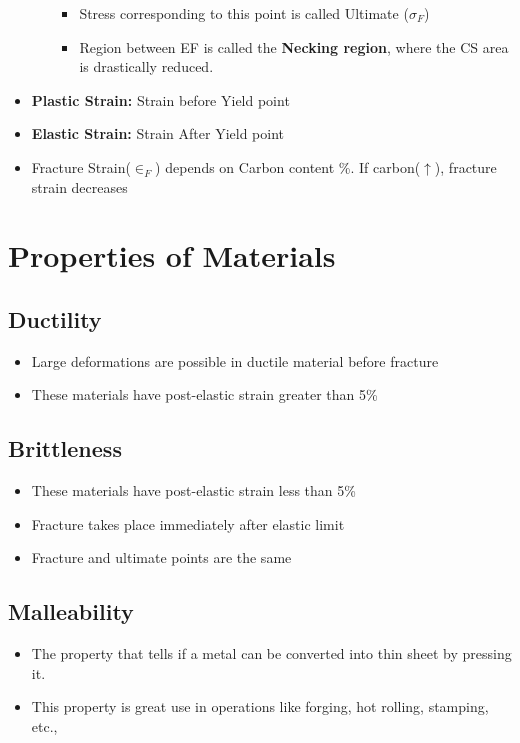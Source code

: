\documentclass[8pt]{report}
\begin{document}
\begin{itemize}
\begin{itemize}
					\begin{itemize}
						\item Stress corresponding to this point is called Ultimate  ($\sigma_F$)
						\item Region between EF is called the \textbf{Necking region}, where the CS area is drastically reduced.
					\end{itemize}
			\end{itemize}
		\item \textbf{Plastic Strain:} Strain before Yield point
		\item \textbf{Elastic Strain:} Strain After Yield point
		\item Fracture Strain($\in_F$) depends on Carbon content \%. If carbon($\uparrow$), fracture strain decreases
	\end{itemize}\hrulefill
\section{Properties of Materials}
	\subsection{Ductility}
		\begin{itemize}
			\item Large deformations are possible in ductile material before fracture
			\item These materials have post-elastic strain greater than 5\%
		\end{itemize}\hrulefill
	\subsection{Brittleness}
		\begin{itemize}
			\item These materials have post-elastic strain less than 5\%
			\item Fracture takes place immediately after elastic limit
			\item Fracture and ultimate points are the same
		\end{itemize}\hrulefill
	\subsection{Malleability}
		\begin{itemize}
			\item The property that tells if a metal can be converted into thin sheet by pressing it. 
			\item This property is great use in operations like forging, hot rolling, stamping, etc.,
		\end{itemize}\hrulefill
\end{document}
